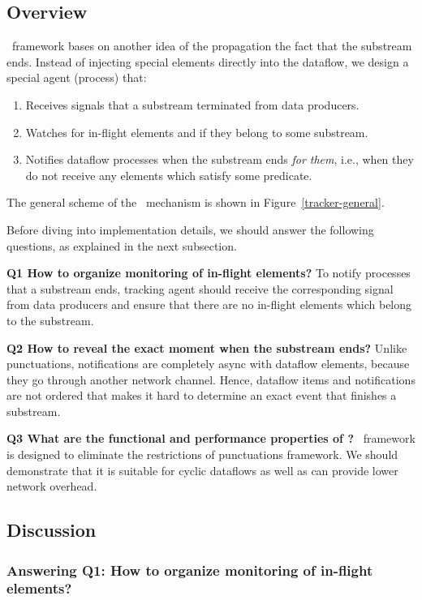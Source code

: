 \label{fs-acker-preliminaries}

\subsection{Overview}

\tracker\ framework bases on another idea of the propagation the fact that the substream ends. Instead of injecting special elements directly into the dataflow, we design a special agent (process) that:

\begin{enumerate}
    \item Receives signals that a substream terminated from data producers.
    \item Watches for in-flight elements and if they belong to some substream.
    \item Notifies dataflow processes when the substream ends {\em for them}, i.e., when they do not receive any elements which satisfy some predicate.
\end{enumerate}

The general scheme of the \tracker\ mechanism is shown in Figure~\ref{tracker-general}. 

Before diving into implementation details, we should answer the following questions, as explained in the next subsection.

{\bf Q1 How to organize monitoring of in-flight elements?} To notify processes that a substream ends, tracking agent should receive the corresponding signal from data producers and ensure that there are no in-flight elements which belong to the substream. 

{\bf Q2 How to reveal the exact moment when the substream ends?} Unlike punctuations, \tracker notifications are completely async with dataflow elements, because they go through another network channel. Hence, dataflow items and notifications are not ordered that makes it hard to determine an exact event that finishes a substream.

{\bf Q3 What are the functional and performance properties of \tracker?} \tracker\ framework is designed to eliminate the restrictions of punctuations framework. We should demonstrate that it is suitable for cyclic dataflows as well as can provide lower network overhead.


\subsection{Discussion}

\subsubsection{Answering Q1: How to organize monitoring of in-flight elements?}


